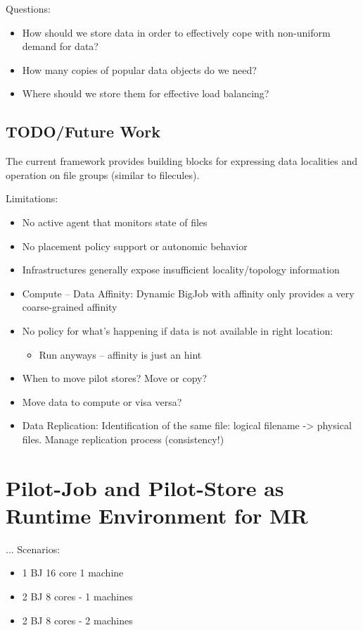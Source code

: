 \documentclass[]{article}
\begin{document}
Questions:
\begin{itemize}
    \item How should
    we store data in order to effectively cope with non-uniform demand for
    data? 
    \item How many copies of popular data objects do we need? 
    \item Where should we store them for effective load balancing?
\end{itemize}

\subsection{TODO/Future Work}
The current framework provides building blocks for expressing data localities and operation on file groups (similar to filecules).

Limitations:
\begin{itemize}
    \item No active agent that monitors state of files
    \item No placement policy support or autonomic behavior
    \item Infrastructures generally expose insufficient locality/topology information
    \item Compute – Data Affinity: Dynamic BigJob with affinity only provides a very coarse-grained affinity
    \item No policy for what’s happening if data is not available in right location:
    \begin{itemize}
        \item Run anyways – affinity is just an hint
    \end{itemize}
    \item When to move pilot stores? Move or copy?
    \item Move data to compute or visa versa?
    \item Data Replication: Identification of the same file: logical filename -> physical files. Manage replication process (consistency!)
\end{itemize}

\section{Pilot-Job and Pilot-Store as Runtime Environment for MR}
...
Scenarios:
\begin{itemize}
	\item 1 BJ 16 core 1 machine
	\item 2 BJ 8 cores - 1 machines
	\item 2 BJ 8 cores - 2 machines
\end{itemize}
\end{document}
